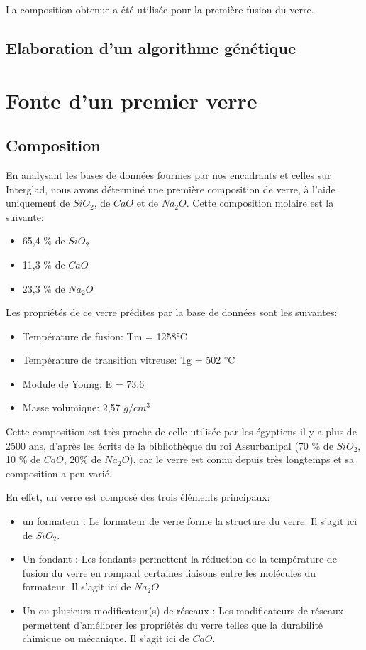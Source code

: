 \documentclass{article}
\begin{document}
La composition obtenue a été utilisée pour la première fusion du verre.

\subsection{Elaboration d'un algorithme génétique}

\section{Fonte d'un premier verre}
\subsection{Composition}

En analysant les bases de données fournies par nos encadrants et celles sur Interglad, nous avons déterminé une première composition de verre, à l'aide uniquement de $SiO_2$, de $CaO$ et de $Na_2O$. Cette composition molaire est la suivante:

\begin{itemize}
    \item 65,4 \% de $SiO_2$
    \item 11,3 \% de $CaO$
    \item 23,3 \% de $Na_2O$
\end{itemize}

Les propriétés de ce verre prédites par la base de données sont les suivantes:
\begin{itemize}
    \item Température de fusion: Tm = 1258°C
    \item Température de transition vitreuse: Tg = 502 °C 
    \item Module de Young: E = 73,6
    \item Masse volumique: 2,57 $g/cm^{3}$ \\
\end{itemize}

Cette composition est très proche de celle utilisée par les égyptiens il y a plus de 2500 ans, d’après les écrits de la bibliothèque du roi Assurbanipal (70 \% de $SiO_2$, 10 \% de $CaO$, 20\% de $Na_2O$), car le verre est connu depuis très longtemps et sa composition a peu varié. 

En effet, un verre est composé des trois éléments principaux:
\begin{itemize}
    \item un formateur : Le formateur de verre forme la structure du verre. Il s'agit ici de $SiO_2$.
    \item Un fondant : Les fondants permettent la réduction de la température de fusion du verre en rompant certaines liaisons entre les molécules du formateur. Il s'agit ici de $Na_2O$
    \item Un ou plusieurs modificateur(s) de réseaux : Les modificateurs de réseaux permettent d'améliorer les propriétés du verre telles que la durabilité chimique ou mécanique. Il s'agit ici de $CaO$.
\end{itemize}
\end{document}
